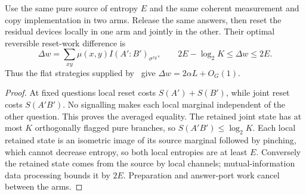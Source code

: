 \begin{proposition}\label{hp:prop:paired}
Use the same pure source of entropy $E$ and the same coherent measurement and copy implementation in two arms. Release the same answers, then reset the residual devices locally in one arm and jointly in the other. Their optimal reversible reset-work difference is
\begin{equation}
 \Delta w=\sum_{xy}\mu(x,y)I(A':B')_{\sigma^{xy}},\qquad
 2E-\log_2K\le\Delta w\le2E.\label{hp:eq:paired}
\end{equation}
Thus the flat strategies supplied by~\cite[Theorem 11.9(b)]{HPprecision} give $\Delta w=2\alpha L+O_G(1)$.
\end{proposition}
\begin{proof}
At fixed questions local reset costs $S(A')+S(B')$, while joint reset costs $S(A'B')$. No signalling makes each local marginal independent of the other question. This proves the averaged equality. The retained joint state has at most $K$ orthogonally flagged pure branches, so $S(A'B')\le\log_2K$. Each local retained state is an isometric image of its source marginal followed by pinching, which cannot decrease entropy, so both local entropies are at least $E$. Conversely the retained state comes from the source by local channels; mutual-information data processing bounds it by $2E$. Preparation and answer-port work cancel between the arms.
\end{proof}

